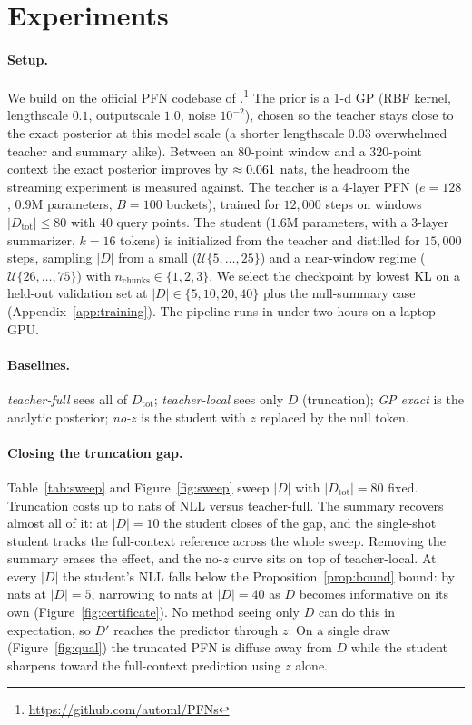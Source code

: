 \documentclass{article}
\newcommand{\Dtot}{D_{\mathrm{tot}}}
\newcommand{\Dfar}{D'}
\newcommand{\Dloc}{D}
\begin{document}
\section{Experiments}
\label{sec:experiments}

\paragraph{Setup.} We build on the official PFN codebase of
\citet{muller2022pfn}.\footnote{\url{https://github.com/automl/PFNs}} The prior
is a 1-d GP (RBF kernel, lengthscale $0.1$, outputscale $1.0$, noise $10^{-2}$),
chosen so the teacher stays close to the exact posterior at this model scale (a
shorter lengthscale $0.03$ overwhelmed teacher and summary alike). Between an
$80$-point window and a $320$-point context the exact posterior improves by
$\approx0.061{}$ nats, the headroom the streaming experiment is
measured against. The teacher is a 4-layer PFN ($e=128$, $0.9$M parameters,
$B=100$ buckets), trained for $12{,}000$ steps on windows $|\Dtot| \le 80$ with
$40$ query points. The student ($1.6$M parameters, with a 3-layer summarizer,
$k=16$ tokens) is initialized from the teacher and distilled for $15{,}000$
steps, sampling $|\Dloc|$ from a small ($\mathcal{U}\{5,\dots,25\}$) and a
near-window regime ($\mathcal{U}\{26,\dots,75\}$) with
$n_{\mathrm{chunks}} \in \{1,2,3\}$. We select the checkpoint by lowest KL on a
held-out validation set at $|\Dloc| \in \{5,10,20,40\}$ plus the null-summary
case (Appendix~\ref{app:training}). The pipeline runs in under two hours on a
laptop GPU.

\paragraph{Baselines.} \emph{teacher-full} sees all of $\Dtot$;
\emph{teacher-local} sees only $\Dloc$ (truncation); \emph{GP exact} is the
analytic posterior; \emph{no-$z$} is the student with $z$ replaced by the null
token.

\paragraph{Closing the truncation gap.} Table~\ref{tab:sweep} and
Figure~\ref{fig:sweep} sweep $|\Dloc|$ with $|\Dtot|=80$ fixed. Truncation costs
up to \truncgapmax{} nats of NLL versus teacher-full. The summary recovers
almost all of it: at $|\Dloc|=10$ the student closes \shortclosepct{} of the
gap, and the single-shot student tracks the full-context reference across the
whole sweep. Removing the summary erases the effect, and the no-$z$ curve sits on
top of teacher-local. At every $|\Dloc|$ the student's NLL falls below the
Proposition~\ref{prop:bound} bound: by \certmarginmax{} nats at $|\Dloc|=5$,
narrowing to \certmarginmin{} nats at $|\Dloc|=40$ as $\Dloc$ becomes
informative on its own (Figure~\ref{fig:certificate}). No method seeing only
$\Dloc$ can do this in expectation, so $\Dfar$ reaches the predictor through
$z$. On a single draw (Figure~\ref{fig:qual}) the truncated PFN is diffuse away
from $\Dloc$ while the student sharpens toward the full-context prediction using
$z$ alone.
\end{document}

